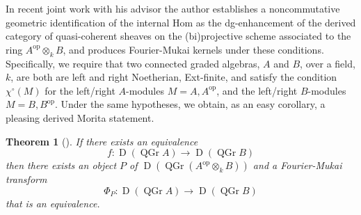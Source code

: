 \documentclass[11pt]{article}
\newtheorem{theorem}{Theorem}[section]
\begin{document}
In recent joint work with his advisor \cite{BF17} the author establishes a noncommutative geometric identification of the internal Hom as the dg-enhancement of the derived category of quasi-coherent sheaves on the (bi)projective scheme associated to the ring $A^{\operatorname{op}} \otimes_k B$, and produces Fourier-Mukai kernels under these conditions.
Specifically, we require that two connected graded algebras, $A$ and $B$, over a field, $k$, are both are left and right Noetherian, Ext-finite, and satisfy the condition $\chi^\circ(M)$ for the left/right $A$-modules $M = A, A^{\operatorname{op}}$, and the left/right $B$-modules $M = B, B^{\operatorname{op}}$.
Under the same hypotheses, we obtain, as an easy corollary, a pleasing derived Morita statement.
\begin{theorem}[\cite{BF17}]
  If there exists an equivalence
  $$f \colon \operatorname{D}(\operatorname{QGr} A) \to \operatorname{D}(\operatorname{QGr} B)$$
  then there exists an object $P$ of $\operatorname{D}\left(\operatorname{QGr} \left(A^{\operatorname{op}} \otimes_k B\right)\right)$ and a Fourier-Mukai transform
  $$\Phi_P \colon \operatorname{D}(\operatorname{QGr} A) \to \operatorname{D}(\operatorname{QGr} B)$$
  that is an equivalence.
\end{theorem}


\end{document}

